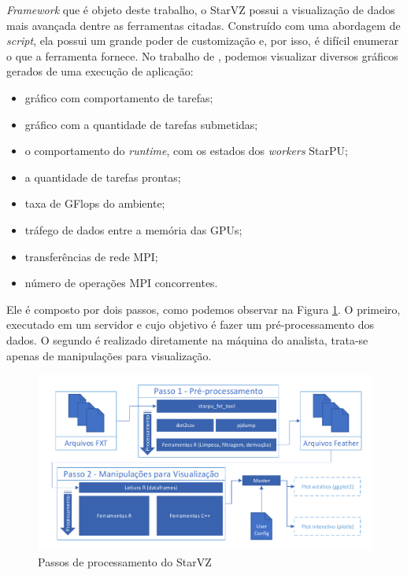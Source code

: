 \documentclass[prop-esp]{iiufrgs}
\begin{document}
\emph{Framework} que é objeto deste trabalho, o StarVZ \cite{ref:starvz} possui a visualização de dados mais avançada dentre as ferramentas citadas.
Construído com uma abordagem de \emph{script}, ela possui um grande poder de customização e, por isso, é difícil enumerar o que a ferramenta fornece.
No trabalho de \citet{ref:starvz}, podemos visualizar diversos gráficos gerados de uma execução de aplicação:

\begin{itemize}
    \item gráfico com comportamento de tarefas;
    \item gráfico com a quantidade de tarefas submetidas;
    \item o comportamento do \emph{runtime}, com os estados dos \emph{workers} StarPU;
    \item a quantidade de tarefas prontas;
    \item taxa de GFlops do ambiente;
    \item tráfego de dados entre a memória das GPUs;
    \item transferências de rede MPI;
    \item número de operações MPI concorrentes.
\end{itemize}

Ele é composto por dois passos, como podemos observar na Figura \ref{fig:starvz-steps}. O primeiro, executado em um servidor e cujo objetivo é fazer um pré-processamento dos dados. O segundo é realizado diretamente na máquina do analista, trata-se apenas de manipulações para visualização.

\begin{figure}[H]
 \centerline{\includegraphics[width=1\textwidth]{./images/all-proc.pdf}}
 \caption{Passos de processamento do StarVZ}
 \label{fig:starvz-steps}
\end{figure}
\end{document}
